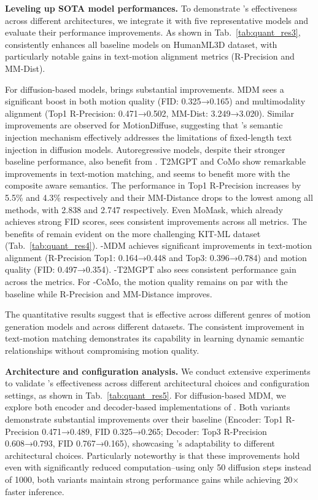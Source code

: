 \textbf{Leveling up SOTA model performances.}
To demonstrate {\modulename}'s effectiveness across different architectures, we integrate it with five representative models and evaluate their performance improvements. 
As shown in Tab.~\ref{tab:quant_res3}, {\modulename} consistently enhances all baseline models on HumanML3D dataset, with particularly notable gains in text-motion alignment metrics (R-Precision and MM-Dist).

For diffusion-based models, {\modulename} brings substantial improvements. MDM sees a significant boost in both motion quality (FID: 0.325→0.165) and multimodality alignment (Top1 R-Precision: 0.471→0.502, MM-Dist: 3.249→3.020). 
Similar improvements are observed for MotionDiffuse, suggesting that {\modulename}'s semantic injection mechanism effectively addresses the limitations of fixed-length text injection in diffusion models.
Autoregressive models, despite their stronger baseline performance, also benefit from {\modulename}. 
T2MGPT and CoMo show remarkable improvements in text-motion matching, and seems to benefit more with the composite aware semantics. 
The performance in Top1 R-Precision increases by 5.5\% and 4.3\% respectively and their MM-Distance drops to the lowest among all methods, with 2.838 and 2.747 respectively.
Even MoMask, which already achieves strong FID scores, sees consistent improvements across all metrics.
The benefits of {\modulename} remain evident on the more challenging KIT-ML dataset (Tab.~\ref{tab:quant_res4}). 
{\modulename}-MDM achieves significant improvements in text-motion alignment (R-Precision Top1: 0.164→0.448 and Top3: 0.396→0.784) and motion quality (FID: 0.497→0.354). 
{\modulename}-T2MGPT also sees consistent performance gain across the metrics.
For {\modulename}-CoMo,
the motion quality remains on par with the baseline while R-Precision and MM-Distance improves.

The quantitative results suggest that {\modulename} is effective across different genres of motion generation models and across different datasets.
The consistent improvement in text-motion matching demonstrates its capability in learning dynamic semantic relationships without compromising motion quality.


\textbf{Architecture and configuration analysis.}
We conduct extensive experiments to validate {\modulename}'s effectiveness across different architectural choices and configuration settings, as shown in Tab.~\ref{tab:quant_res5}.
For diffusion-based MDM, we explore both encoder and decoder-based implementations of {\modulename}. Both variants demonstrate substantial improvements over their baseline (Encoder: Top1 R-Precision 0.471→0.489, FID 0.325→0.265; Decoder: Top3 R-Precision 0.608→0.793, FID 0.767→0.165), showcasing {\modulename}'s adaptability to different architectural choices. Particularly noteworthy is that these improvements hold even with significantly reduced computation--using only 50 diffusion steps instead of 1000, both variants maintain strong performance gains while achieving 20× faster inference.

